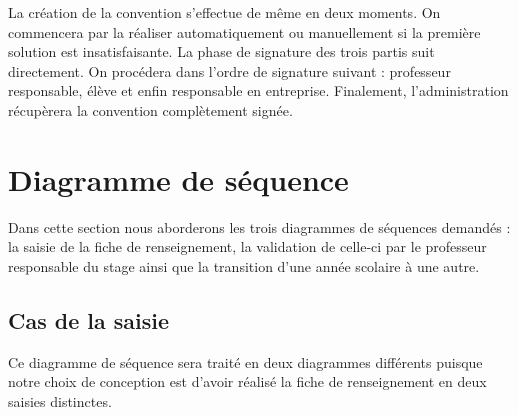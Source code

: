 \documentclass{scrreprt}
\begin{document}

\newpage
	La création de la convention s'effectue de même en deux moments. On commencera par la réaliser 
automatiquement ou manuellement si la première solution est insatisfaisante. La phase de signature des trois
partis suit directement. On procédera dans l'ordre de signature suivant : professeur responsable, élève 
et enfin responsable en entreprise. Finalement, l'administration récupèrera la convention complètement signée.


\newpage
\chapter{Diagramme de séquence}

Dans cette section nous aborderons les trois diagrammes de séquences demandés : la saisie de la fiche de renseignement,
la validation de celle-ci par le professeur responsable du stage ainsi que la transition d'une année scolaire à une autre.

\newpage
\section{Cas de la saisie}

Ce diagramme de séquence sera traité en deux diagrammes différents puisque notre choix de conception est d'avoir réalisé
la fiche de renseignement en deux saisies distinctes.
\end{document}
